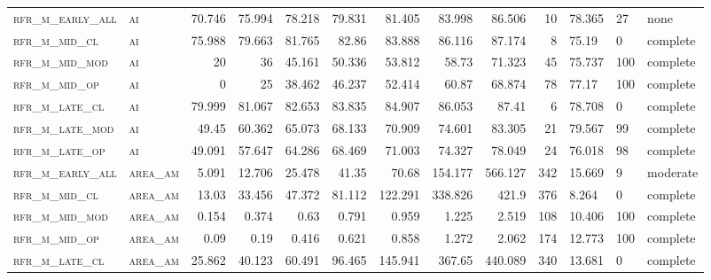 \begin{landscape}
\begin{center}
\begin{longtable}{llrrrrr|rrr}
\textsc{rfr\_m\_early\_all} & \textsc{ai        }   & 70.746  & 75.994  & 78.218  & 79.831   & 81.405   & 83.998   & 86.506   & 10     & 78.365        & 27            & none       \\
\textsc{rfr\_m\_mid\_cl   } & \textsc{ai        }   & 75.988  & 79.663  & 81.765  & 82.86    & 83.888   & 86.116   & 87.174   & 8      & 75.19         & 0             & complete           \\
\textsc{rfr\_m\_mid\_mod  } & \textsc{ai        }   & 20      & 36      & 45.161  & 50.336   & 53.812   & 58.73    & 71.323   & 45     & 75.737        & 100           & complete       \\
\textsc{rfr\_m\_mid\_op   } & \textsc{ai        }   & 0       & 25      & 38.462  & 46.237   & 52.414   & 60.87    & 68.874   & 78     & 77.17         & 100           & complete       \\
\textsc{rfr\_m\_late\_cl  } & \textsc{ai        }   & 79.999  & 81.067  & 82.653  & 83.835   & 84.907   & 86.053   & 87.41    & 6      & 78.708        & 0             & complete           \\
\textsc{rfr\_m\_late\_mod } & \textsc{ai        }   & 49.45   & 60.362  & 65.073  & 68.133   & 70.909   & 74.601   & 83.305   & 21     & 79.567        & 99            & complete       \\
\textsc{rfr\_m\_late\_op  } & \textsc{ai        }   & 49.091  & 57.647  & 64.286  & 68.469   & 71.003   & 74.327   & 78.049   & 24     & 76.018        & 98            & complete       \\
\textsc{rfr\_m\_early\_all} & \textsc{area\_am  }   & 5.091   & 12.706  & 25.478  & 41.35    & 70.68    & 154.177  & 566.127  & 342    & 15.669        & 9             & moderate       \\
\textsc{rfr\_m\_mid\_cl   } & \textsc{area\_am  }   & 13.03   & 33.456  & 47.372  & 81.112   & 122.291  & 338.826  & 421.9    & 376    & 8.264         & 0             & complete           \\
\textsc{rfr\_m\_mid\_mod  } & \textsc{area\_am  }   & 0.154   & 0.374   & 0.63    & 0.791    & 0.959    & 1.225    & 2.519    & 108    & 10.406        & 100           & complete       \\
\textsc{rfr\_m\_mid\_op   } & \textsc{area\_am  }   & 0.09    & 0.19    & 0.416   & 0.621    & 0.858    & 1.272    & 2.062    & 174    & 12.773        & 100           & complete       \\
\textsc{rfr\_m\_late\_cl  } & \textsc{area\_am  }   & 25.862  & 40.123  & 60.491  & 96.465   & 145.941  & 367.65   & 440.089  & 340    & 13.681        & 0             & complete           \\

\end{longtable}
\end{center}
\end{landscape}
